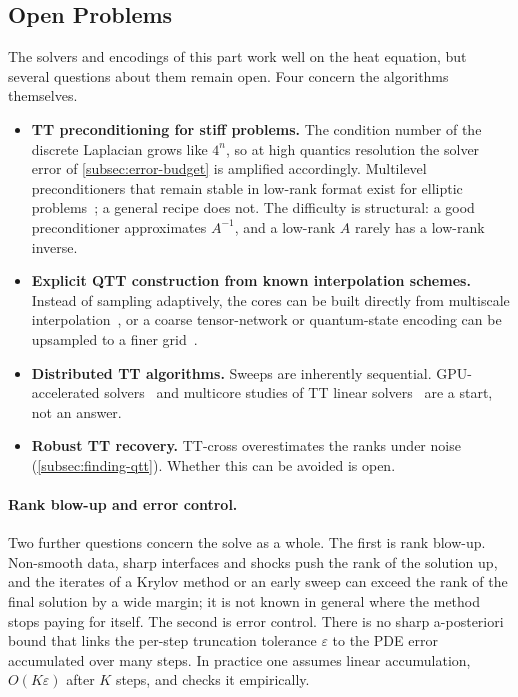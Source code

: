 \subsection{Open Problems}
\label{subsec:part2-open-problems}

The solvers and encodings of this part work well on the heat equation, but
several questions about them remain open. Four concern the algorithms
themselves.
\begin{itemize}
  \item \textbf{TT preconditioning for stiff problems.} The condition number of
    the discrete Laplacian grows like $4^n$, so at high quantics resolution the
    solver error of \cref{subsec:error-budget} is amplified accordingly.
    Multilevel preconditioners that remain stable in low-rank format exist for
    elliptic problems~\cite{Bachmayr2020}; a general recipe does not. The
    difficulty is structural: a good preconditioner approximates $A^{-1}$, and a
    low-rank $A$ rarely has a low-rank inverse.
  \item \textbf{Explicit QTT construction from known interpolation schemes.}
    Instead of sampling adaptively, the cores can be built directly from
    multiscale interpolation~\cite{Lindsey2023}, or a coarse tensor-network or
    quantum-state encoding can be upsampled to a finer grid~\cite{Guzman2026}.
  \item \textbf{Distributed TT algorithms.} Sweeps are inherently sequential.
    GPU-accelerated solvers~\cite{Hoelscher2025} and multicore studies of TT
    linear solvers~\cite{Roehrig2025} are a start, not an answer.
  \item \textbf{Robust TT recovery.} TT-cross overestimates the ranks under
    noise (\cref{subsec:finding-qtt}). Whether this can be avoided is open.
\end{itemize}

\paragraph{Rank blow-up and error control.}
Two further questions concern the solve as a whole. The first is rank blow-up.
Non-smooth data, sharp interfaces and shocks push the rank of the solution up,
and the iterates of a Krylov method or an early sweep can exceed the rank of the
final solution by a wide margin; it is not known in general where the method
stops paying for itself. The second is error control. There is no sharp
a-posteriori bound that links the per-step truncation tolerance $\varepsilon$ to
the PDE error accumulated over many steps. In practice one assumes linear
accumulation, $O(K\varepsilon)$ after $K$ steps, and checks it empirically.

